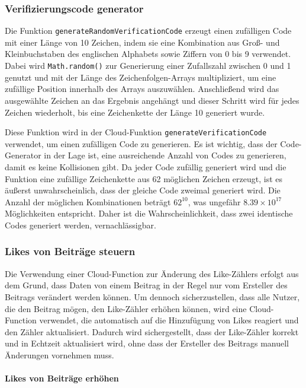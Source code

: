 \subsubsection{Verifizierungscode generator}

Die Funktion \texttt{generateRandomVerificationCode} erzeugt einen zufälligen Code mit einer Länge von 10 Zeichen, indem sie eine Kombination aus Groß- und Kleinbuchstaben des englischen Alphabets sowie Ziffern von 0 bis 9 verwendet. Dabei wird \texttt{Math.random()} zur Generierung einer Zufallszahl zwischen 0 und 1 genutzt und mit der Länge des Zeichenfolgen-Arrays multipliziert, um eine zufällige Position innerhalb des Arrays auszuwählen. Anschließend wird das ausgewählte Zeichen an das Ergebnis angehängt und dieser Schritt wird für jedes Zeichen wiederholt, bis eine Zeichenkette der Länge 10 generiert wurde.

Diese Funktion wird in der Cloud-Funktion \texttt{generateVerificationCode} verwendet, um einen zufälligen Code zu generieren. Es ist wichtig, dass der Code-Generator in der Lage ist, eine ausreichende Anzahl von Codes zu generieren, damit es keine Kollisionen gibt. Da jeder Code zufällig generiert wird und die Funktion eine zufällige Zeichenkette aus 62 möglichen Zeichen erzeugt, ist es äußerst unwahrscheinlich, dass der gleiche Code zweimal generiert wird. Die Anzahl der möglichen Kombinationen beträgt $62^{10}$, was ungefähr $8.39 \times 10^{17}$ Möglichkeiten entspricht. Daher ist die Wahrscheinlichkeit, dass zwei identische Codes generiert werden, vernachlässigbar.

\subsubsection{Likes von Beiträge steuern}

Die Verwendung einer Cloud-Function zur Änderung des Like-Zählers erfolgt aus dem Grund, dass Daten von einem Beitrag in der Regel nur vom Ersteller des Beitrags verändert werden können. Um dennoch sicherzustellen, dass alle Nutzer, die den Beitrag mögen, den Like-Zähler erhöhen können, wird eine Cloud-Function verwendet, die automatisch auf die Hinzufügung von Likes reagiert und den Zähler aktualisiert. Dadurch wird sichergestellt, dass der Like-Zähler korrekt und in Echtzeit aktualisiert wird, ohne dass der Ersteller des Beitrags manuell Änderungen vornehmen muss.

\paragraph{Likes von Beiträge erhöhen}

